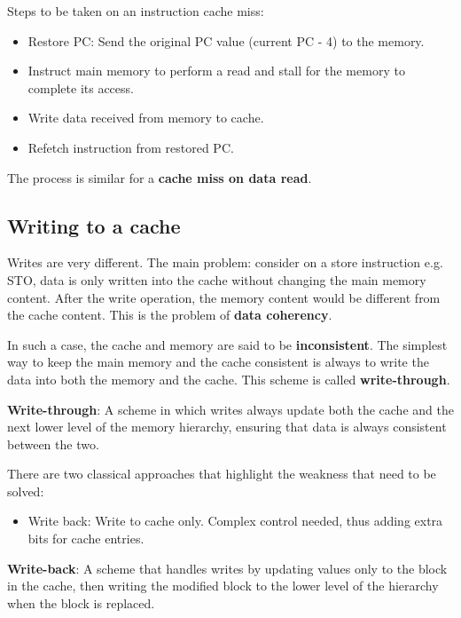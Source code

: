 \documentclass[10pt,a4paper]{article}
\begin{document}
Steps to be taken on an instruction cache miss:
\begin{itemize}
    \item Restore PC: Send the original PC value (current PC - 4) to the memory.
    \item Instruct main memory to perform a read and stall for the memory to complete its access.
    \item Write data received from memory to cache.
    \item Refetch instruction from restored PC.
\end{itemize}

The process is similar for a \textbf{cache miss on data read}.

\subsection{Writing to a cache}

Writes are very different. The main problem: consider on a store instruction e.g. STO, data is
only written into the cache without changing the main memory content. After the write operation, the
memory content would be different from the cache content. This is the problem of \textbf{data coherency}.

In such a case, the cache and memory are said to be \textbf{inconsistent}. The simplest way to keep
the main memory and the cache consistent is always to write the data into both the memory and the
cache. This scheme is called \textbf{write-through}.

\begin{tcolorbox}[breakable,colback=white]
\textbf{Write-through}: A scheme in which writes always update both the cache and the next lower
level of the memory hierarchy, ensuring that data is always consistent between the two.
\end{tcolorbox}

\pagebreak

There are two classical approaches that highlight the weakness that need to be solved:
\begin{itemize}
    \item Write back:  Write to cache only. Complex control needed, thus adding extra bits for cache entries.
\end{itemize}

\begin{tcolorbox}[breakable,colback=white]
\textbf{Write-back}: A scheme that handles writes by updating values only to the block in the cache,
then writing the modified block to the lower level of the hierarchy when the block is replaced.
\end{tcolorbox}
\end{document}
